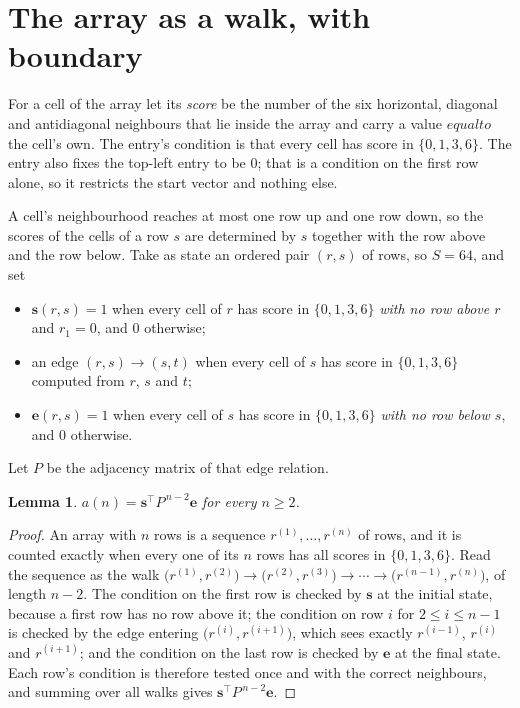 \documentclass[11pt,a4paper]{article}
\theoremstyle{plain}
\newtheorem{lemma}[theorem]{Lemma}
\theoremstyle{definition}
\begin{document}
\section{The array as a walk, with boundary}

For a cell of the array let its \emph{score} be the number of the six horizontal, diagonal and antidiagonal neighbours that lie inside
the array and carry a value $equal to$ the cell's own. The entry's condition is that every cell
has score in $\{0,1,3,6\}$. The entry also fixes the top-left entry to be $0$; that is a condition on the first row alone, so it restricts the start vector and nothing else.

A cell's neighbourhood reaches at most one row up and one row down, so the scores of the
cells of a row $s$ are determined by $s$ together with the row above and the row below.
Take as state an ordered pair $(r,s)$ of rows, so $S=64$, and set
\begin{itemize}
\item $\mathbf{s}(r,s)=1$ when every cell of $r$ has score in $\{0,1,3,6\}$ \emph{with no row
above $r$} and $r_1=0$, and $0$ otherwise;
\item an edge $(r,s)\to(s,t)$ when every cell of $s$ has score in $\{0,1,3,6\}$ computed from
$r$, $s$ and $t$;
\item $\mathbf{e}(r,s)=1$ when every cell of $s$ has score in $\{0,1,3,6\}$ \emph{with no row
below $s$}, and $0$ otherwise.
\end{itemize}
Let $P$ be the adjacency matrix of that edge relation.

\begin{lemma}\label{lem:walk}
$a(n)=\mathbf{s}^{\!\top}P^{\,n-2}\mathbf{e}$ for every $n\ge2$.
\end{lemma}

\begin{proof}
An array with $n$ rows is a sequence $r^{(1)},\dots,r^{(n)}$ of rows, and it is counted
exactly when every one of its $n$ rows has all scores in $\{0,1,3,6\}$. Read the sequence as the
walk $\bigl(r^{(1)},r^{(2)}\bigr)\to\bigl(r^{(2)},r^{(3)}\bigr)\to\cdots\to
\bigl(r^{(n-1)},r^{(n)}\bigr)$, of length $n-2$. The condition on the first row is
checked by $\mathbf{s}$ at the initial state, because a first row has no row above it; the
condition on row $i$ for $2\le i\le n-1$ is checked by the edge entering
$\bigl(r^{(i)},r^{(i+1)}\bigr)$, which sees exactly $r^{(i-1)}$, $r^{(i)}$ and
$r^{(i+1)}$; and the condition on the last row is checked by $\mathbf{e}$ at the final
state. Each row's condition is therefore tested once and with the correct neighbours, and
summing over all walks gives $\mathbf{s}^{\!\top}P^{\,n-2}\mathbf{e}$.
\end{proof}
\end{document}
